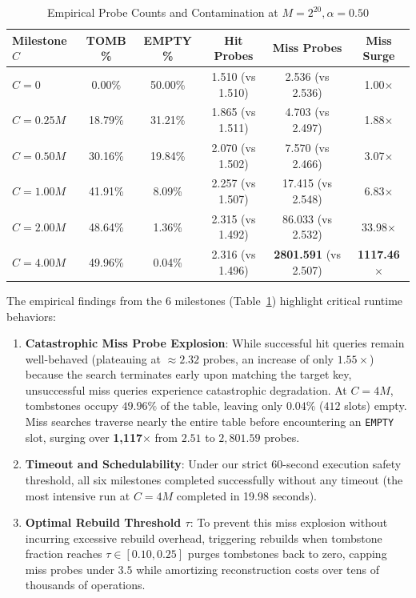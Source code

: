 \documentclass[conference]{IEEEtran}
\begin{document}
\begin{table}[htbp]
\caption{Empirical Probe Counts and Contamination at $M=2^{20}, \alpha=0.50$}
\label{tab:rq2_results}
\centering
\begin{tabular}{|l|c|c|c|c|c|}
\hline
\textbf{Milestone $C$} & \textbf{TOMB \%} & \textbf{EMPTY \%} & \textbf{Hit Probes} & \textbf{Miss Probes} & \textbf{Miss Surge} \\
\hline
$C = 0$       & 0.00\%  & 50.00\% & 1.510 (vs 1.510) & 2.536 (vs 2.536) & 1.00$\times$ \\
$C = 0.25M$   & 18.79\% & 31.21\% & 1.865 (vs 1.511) & 4.703 (vs 2.497) & 1.88$\times$ \\
$C = 0.50M$   & 30.16\% & 19.84\% & 2.070 (vs 1.502) & 7.570 (vs 2.466) & 3.07$\times$ \\
$C = 1.00M$   & 41.91\% & 8.09\%  & 2.257 (vs 1.507) & 17.415 (vs 2.548) & 6.83$\times$ \\
$C = 2.00M$   & 48.64\% & 1.36\%  & 2.315 (vs 1.492) & 86.033 (vs 2.532) & 33.98$\times$ \\
$C = 4.00M$   & 49.96\% & 0.04\%  & 2.316 (vs 1.496) & \textbf{2801.591} (vs 2.507) & \textbf{1117.46$\times$} \\
\hline
\end{tabular}
\end{table}

The empirical findings from the 6 milestones (Table~\ref{tab:rq2_results}) highlight critical runtime behaviors:
\begin{enumerate}
    \item \textbf{Catastrophic Miss Probe Explosion}: While successful hit queries remain well-behaved (plateauing at $\approx 2.32$ probes, an increase of only $1.55\times$) because the search terminates early upon matching the target key, unsuccessful miss queries experience catastrophic degradation. At $C = 4M$, tombstones occupy $49.96\%$ of the table, leaving only $0.04\%$ ($412$ slots) empty. Miss searches traverse nearly the entire table before encountering an \texttt{EMPTY} slot, surging over \textbf{1,117$\times$} from $2.51$ to $2,801.59$ probes.
    \item \textbf{Timeout and Schedulability}: Under our strict 60-second execution safety threshold, all six milestones completed successfully without any timeout (the most intensive run at $C = 4M$ completed in 19.98 seconds).
    \item \textbf{Optimal Rebuild Threshold $\tau$}: To prevent this miss explosion without incurring excessive rebuild overhead, triggering rebuilds when tombstone fraction reaches $\tau \in [0.10, 0.25]$ purges tombstones back to zero, capping miss probes under $3.5$ while amortizing reconstruction costs over tens of thousands of operations.
\end{enumerate}
\end{document}
